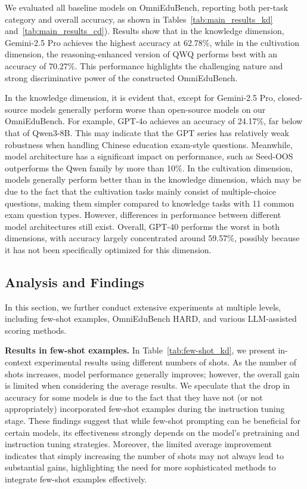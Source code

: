 We evaluated all baseline models on OmniEduBench, reporting both per-task category and overall accuracy, as shown in Tables~\ref{tab:main_results_kd} and~\ref{tab:main_results_cd}). Results show that in the knowledge dimension, Gemini-2.5 Pro achieves the highest accuracy at 62.78\%, while in the cultivation dimension, the reasoning-enhanced version of QWQ performs best with an accuracy of 70.27\%. This performance highlights the challenging nature and strong discriminative power of the constructed OmniEduBench.

In the knowledge dimension, it is evident that, except for Gemini-2.5 Pro, closed-source models generally perform worse than open-source models on our OmniEduBench. For example, GPT-4o achieves an accuracy of 24.17\%, far below that of Qwen3-8B. This may indicate that the GPT series has relatively weak robustness when handling Chinese education exam-style questions. Meanwhile, model architecture has a significant impact on performance, such as Seed-OOS outperforms the Qwen family by more than 10\%. In the cultivation dimension, models generally perform better than in the knowledge dimension, which may be due to the fact that the cultivation tasks mainly consist of multiple-choice questions, making them simpler compared to knowledge tasks with 11 common exam question types. However, differences in performance between different model architectures still exist. Overall, GPT-40 performs the worst in both dimensions, with accuracy largely concentrated around 59.57\%, possibly because it has not been specifically optimized for this dimension.

\subsection{Analysis and Findings}

In this section, we further conduct extensive experiments at multiple levels, including few-shot examples, OmniEduBench HARD, and various LLM-assisted scoring methods.

\textbf{Results in few-shot examples.} In Table~\ref{tab:few-shot_kd}, we present in-context experimental results using different numbers of shots. As the number of shots increases, model performance generally improves; however, the overall gain is limited when considering the average results. We speculate that the drop in accuracy for some models is due to the fact that they have not (or not appropriately) incorporated few-shot examples during the instruction tuning stage. These findings suggest that while few-shot prompting can be beneficial for certain models, its effectiveness strongly depends on the model’s pretraining and instruction tuning strategies. Moreover, the limited average improvement indicates that simply increasing the number of shots may not always lead to substantial gains, highlighting the need for more sophisticated methods to integrate few-shot examples effectively. 

